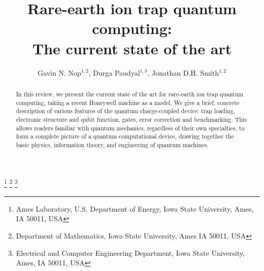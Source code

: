 \documentclass[12pt,a4paper]{amsart}
\numberwithin{equation}{section}
\theoremstyle{plain}
\theoremstyle{definition}
\begin{document}

\title[Rare-earth quantum computing]{Rare-earth ion trap quantum computing:\\ The current state of the art}


\author[Nop, Paudyal, Smith]{Gavin N. Nop$^{1, 2}$, Durga Paudyal$^{1,3}$, Jonathan D.H. Smith$^{1,2}$}









\begin{abstract} \small 

In this review, we present the current state of the art for rare-earth ion trap quantum computing, taking a recent Honeywell machine as a model. We give a brief, concrete description of various features of the quantum charge-coupled device: trap loading, electronic structure and qubit function, gates, error correction and benchmarking. This allows readers familiar with quantum mechanics, regardless of their own specialties, to form a complete picture of a quantum computational device, drawing together the basic physics, information theory, and engineering of quantum machines.
\end{abstract}


\maketitle
\footnote[1]{Ames Laboratory, U.S. Department of Energy, Iowa State University, Ames, IA 50011, USA}
\footnote[2]{Department of Mathematics, Iowa State University, Ames IA 50011, USA}
\footnote[3]{Electrical and Computer Engineering Department, Iowa State University, Ames, IA 50011, USA}
\tableofcontents


\newpage
\end{document}
